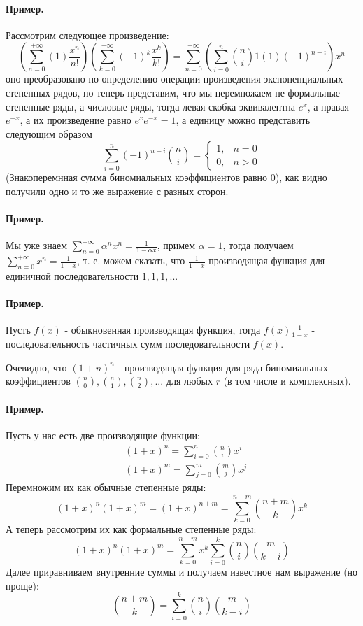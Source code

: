 \paragraph{Пример.}
Рассмотрим следующее произведение:
\[
	\left(\sum_{n=0}^{+\infty} \left(1\right) \frac{x^n}{n!}\right)\left(\sum_{k=0}^{+\infty} {\left(-1\right)}^k \frac{x^k}{k!}\right) = \sum_{n=0}^{+\infty} \left(\sum_{i=0}^{n} \binom{n}{i} 1 \left(1\right) \left(-1\right)^{n-i}\right) x^n
\]
оно преобразовано по определению операции произведения экспоненциальных степенных рядов, но теперь представим, что мы перемножаем не формальные степенные ряды, а числовые ряды, тогда левая скобка эквивалентна $e^x$, а правая $e^{-x}$, а их произведение равно $e^x e^{-x} = 1$, а единицу можно представить следующим образом
\[
	\sum_{i=0}^{n} \left(-1\right)^{n-i} \binom{n}{i} =
	\begin{cases}
		1, & n = 0 \\
		0, & n > 0
	\end{cases}
\]
(Знакоперемнная сумма биномиальных коэффициентов равно 0), как видно получили одно и то же выражение с разных сторон.

\paragraph{Пример.}
Мы уже знаем $\sum_{n=0}^{+\infty} \alpha^n x^n = \frac{1}{1 - \alpha x}$, примем $\alpha = 1$, тогда получаем $\sum_{n=0}^{+\infty} x^n = \frac{1}{1 - x}$, т. е. можем сказать, что $\frac{1}{1 - x}$ производящая функция для единичной последовательности $1, 1, 1, ...$

\paragraph{Пример.}
Пусть $f\left(x\right)$ - обыкновенная производящая функция, тогда $f\left(x\right) \frac{1}{1-x}$ - последовательность частичных сумм последовательности $f\left(x\right)$.

Очевидно, что ${\left(1+n\right)}^n$ - производящая функция для ряда биномиальных коэффициентов $\binom{n}{0}, \binom{n}{1}, \binom{n}{2}, ...$ для любых $r$ (в том числе и комплексных).

\paragraph{Пример.}
Пусть у нас есть две производящие функции:
\[
	\begin{split}
		& {\left(1 + x\right)}^n = \sum_{i=0}^{n} \binom{n}{i} x^i \\
		& {\left(1 + x\right)}^m = \sum_{j=0}^{m} \binom{m}{j} x^j
	\end{split}
\]
Перемножим их как обычные степенные ряды:
\[
	{\left(1+x\right)}^n {\left(1+x\right)}^m = {\left(1+x\right)}^{n+m} = \sum_{k=0}^{n+m} \binom{n+m}{k} x^k
\]
А теперь рассмотрим их как формальные степенные ряды:
\[
	\left(1+x\right)^n \left(1+x\right)^m = \sum_{k=0}^{n+m} x^k \sum_{i=0}^k \binom{n}{i} \binom{m}{k-i}
\]
Далее приравниваем внутренние суммы и получаем известное нам выражение (но проще):
\[
	\binom{n+m}{k} = \sum_{i=0}^k \binom{n}{i} \binom{m}{k-i}
\]

